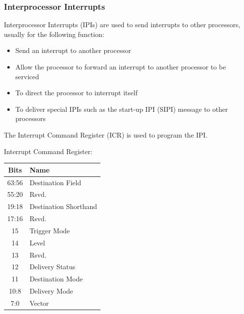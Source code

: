 \documentclass{article}
\newcommand{\layout}[1]{\parbox{\linewidth}{#1}}
\begin{document}
\layout{
  \subsubsection{Interprocessor Interrupts}
  Interprocessor Interrupts (IPIs) are used to send interrupts to other processors, usually for the following function:

  \begin{itemize}
    \item Send an interrupt to another processor
    \item Allow the processor to forward an interrupt to another processor to be serviced
    \item To direct the processor to interrupt itself
    \item To deliver special IPIs such as the start-up IPI (SIPI) message to other processors
  \end{itemize}

  The Interrupt Command Register (ICR) is used to program the IPI.

  \bigskip \cite[Chapter~12.6]{sdm3}
} \bigskip

\layout{
  Interrupt Command Register:
  \begin{table}[H]
    \centering
    \begin{tabular}{|c|l|}
      \hline \textbf{Bits} & \textbf{Name} \\ \hline
      63:56 & Destination Field \\
      55:20 & Rsvd. \\
      19:18 & Destination Shorthand \\
      17:16 & Rsvd. \\
      15 & Trigger Mode \\
      14 & Level \\
      13 & Rsvd. \\
      12 & Delivery Status \\
      11 & Destination Mode \\
      10:8 & Delivery Mode \\
      7:0 & Vector \\ \hline
    \end{tabular}
  \end{table}
}
\end{document}
